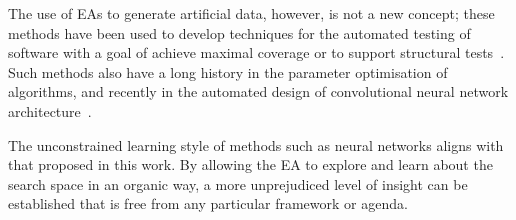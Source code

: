 
The use of EAs to generate artificial data, however, is not a new concept; these
methods have been used to develop techniques for the automated testing of
software with a goal of achieve maximal coverage or to support structural
tests~\cite{Koleejan2015,Michael2001,Sharifipour2018}. Such methods also have
a long history in the parameter optimisation of algorithms, and recently in the
automated design of convolutional neural network
architecture~\cite{Suganuma2017,Sun2018}.


The unconstrained learning style of methods such as neural networks aligns with
that proposed in this work. By allowing the EA to explore and learn about the
search space in an organic way, a more unprejudiced level of insight can be
established that is free from any particular framework or agenda.
